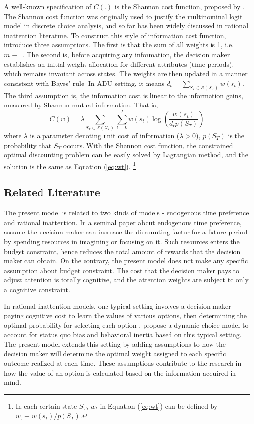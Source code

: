 \documentclass[
  12pt,
]{article}
\begin{document}
A well-known specification of \(C(.)\) is the Shannon cost function,
proposed by \citet{matejka_rational_2015}. The Shannon cost function was
originally used to justify the multinominal logit model in discrete
choice analysis, and so far has been widely discussed in rational
inattention literature. To construct this style of information cost
function, \citet{matejka_rational_2015} introduce three assumptions. The
first is that the sum of all weights is 1, i.e.~\(m\equiv1\). The second
is, before acquiring any information, the decision maker establishes an
initial weight allocation for different attributes (time periods), which
remains invariant across states. The weights are then updated in a
manner consistent with Bayes' rule. In ADU setting, it means
\(d_t=\sum_{S_T\in \mathcal{S}(X_T)} w(s_t)\). The third assumption is,
the information cost is linear to the information gains, measured by
Shannon mutual information. That
is,\[ C(w)= \lambda \sum_{S_T\in \mathcal{S}(X_T)}\sum_{t=0}^T w(s_t) \log\left(\frac{w(s_t)}{d_t p(S_T)}\right) \]where
\(\lambda\) is a parameter denoting unit cost of information
(\(\lambda>0\)), \(p(S_T)\) is the probability that \(S_T\) occurs. With
the Shannon cost function, the constrained optimal discounting problem
can be easily solved by Lagrangian method, and the solution is the same
as Equation (\ref{eq:wt}). \footnote{In each certain state \(S_T\),
  \(w_t\) in Equation (\ref{eq:wt}) can be defined by
  \(w_t\equiv w(s_t)/p(S_T)\).}

\hypertarget{related-literature}{%
\subsection{Related Literature}\label{related-literature}}

The present model is related to two kinds of models - endogenous time
preference and rational inattention. In a seminal paper about endogenous
time preference, \citet{becker_endogenous_1997} assume the decision
maker can increase the discounting factor for a future period by
spending resources in imagining or focusing on it. Such resources enters
the budget constraint, hence reduces the total amount of rewards that
the decision maker can obtain. On the contrary, the present model does
not make any specific assumption about budget constraint. The cost that
the decision maker pays to adjust attention is totally cognitive, and
the attention weights are subject to only a cognitive constraint.

In rational inattention models, one typical setting involves a decision
maker paying cognitive cost to learn the values of various options, then
determining the optimal probability for selecting each option
\citep{caplin_rationally_2022, mackowiak_rational_2023}.
\citet{steiner_rational_2017} propose a dynamic choice model to account
for status quo bias and behavioral inertia based on this typical
setting. The present model extends this setting by adding assumptions to
how the decision maker will determine the optimal weight assigned to
each specific outcome realized at each time. These assumptions
contribute to the research in how the value of an option is calculated
based on the information acquired in mind.
\end{document}
